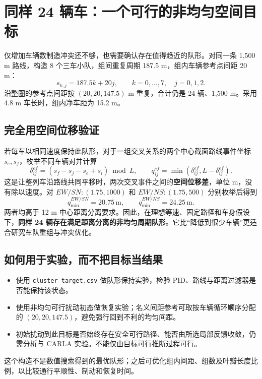\documentclass[UTF8,fontset=fandol,11pt,a4paper]{ctexart}
\newcommand{\unit}[1]{\,\mathrm{#1}}\newcommand{\nom}{\mathrm{nom}}
\newcommand{\page}[1]{\clearpage\section{#1}}
\begin{document}
\page{同样 24 辆车：一个可行的非均匀空间目标}
仅增加车辆数制造冲突还不够，也需要确认存在值得趋近的队形。对同一条 1,500 m 路线，构造 8 个三车小队，组间重复周期 187.5 m，组内车辆参考点间距 20 m：
\[
s_{k,j}=187.5k+20j,\qquad k=0,\ldots,7,\quad j=0,1,2.
\]
沿整圈的参考点间距按 $(20,20,147.5)$ m 重复，合计仍是 24 辆、1,500 m。采用 4.8 m 车长时，组内净车距为 15.2 m。
\begin{center}
\end{center}
\subsection{完全用空间位移验证}
若每车以相同速度保持此队形，对于一组交叉关系的两个中心截面路线事件坐标 $s_e,s_f$，枚举不同车辆对并计算
\[
\delta_{ij}^{ef}=(s_f-s_j-s_e+s_i)\bmod L,\qquad
q_{ij}^{ef}=\min(\delta_{ij}^{ef},L-\delta_{ij}^{ef}).
\]
这是让整列车沿路线共同平移时，两次交叉事件之间的\textbf{空间位移差}，单位 m，没有除以速度。对 $EW/SN:(1.75,1000)$ 和 $EW/NS:(1.75,500)$ 分别枚举后得到
\[
q_{\min}^{EW/SN}=20.75\unit{m},\qquad q_{\min}^{EW/NS}=24.25\unit{m}.
\]
两者均高于 12 m 中心距离分离要求。因此，在理想等速、固定路径和车身假设下，\textbf{同样 24 辆存在满足距离分离的非均匀周期队形}。它比“降低到很少车辆”更适合研究车队重组与冲突优化。

\subsection{如何用于实验，而不把目标当结果}
\begin{itemize}
\item 使用 \texttt{cluster\_target.csv} 做队形保持实验，检验 PID、路线与距离过滤器是否能保持该状态。
\item 使用非均匀可行扰动初态做恢复实验；名义间距参考可取按车辆循环顺序分配的 $(20,20,147.5)$，避免强行回到不利的均匀间距。
\item 初始扰动到此目标是否始终存在安全可行路径、能否由所选局部反馈收敛，仍需分析与 CARLA 实验。不能仅由目标可行推断过程可行。
\end{itemize}
这个构造不是数值搜索得到的最优队形；之后可优化组内间距、组数及叶瓣长度比例，以比较通行平顺性、制动和恢复时间。
\end{document}

